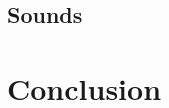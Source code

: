 \documentclass[12pt,a4paper]{article}
\begin{document}
	\subsection{Sounds}
	
	
	\section{Conclusion}
	
	
\end{document}
